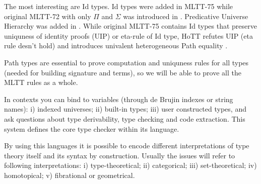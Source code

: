 \documentclass{article}
\theoremstyle{definition}
\begin{document}
The most interesting are Id types. Id types were added in MLTT-75 \cite{Lof84} while original MLTT-72
with only $\Pi$ and $\Sigma$ was introduced in \cite{Lof72}.
Predicative Universe Hierarchy was added in \cite{Lof75}.
While original MLTT-75 contains Id types that preserve uniquness of identity
proofs (UIP) or eta-rule of Id type, HoTT refutes UIP (eta rule desn't hold)
and introduces univalent heterogeneous Path equality \cite{Hofmann96}.

Path types are essential to prove computation and uniquness rules for all types
(needed for building signature and terms), so we will be able to prove all
the MLTT rules as a whole.

In contexts you can bind to variables (through de Brujin indexes or string names):
i) indexed universes; ii) built-in types; iii) user constructed types, and ask
questions about type derivability, type checking and code extraction. This system
defines the core type checker within its language.

By using this languages it is possible to encode different interpretations of
type theory itself and its syntax by construction. Usually the issues will refer to
following interpretations: i) type-theoretical; ii) categorical;
iii) set-theoretical; iv) homotopical; v) fibrational or geometrical.
\end{document}
